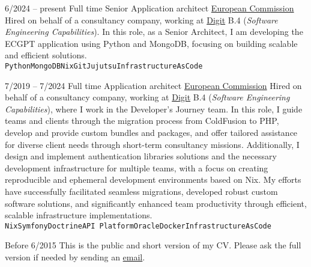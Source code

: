 \begin{entrylist}
	\entry
		{6/2024 -- present}
        {Full time}
		{Senior Application architect}
        {\href{https://ec.europa.eu/}{European Commission}}
        {
            Hired on behalf of a consultancy company, working at
            \href{https://ec.europa.eu/info/departments/informatics_en}{Digit} B.4 (\textit{Software Engineering Capabilities}).
			In this role, as a Senior Architect, I am developing the ECGPT application using Python and MongoDB,
			focusing on building scalable and efficient solutions.
			\\ \texttt{Python}\slashsep\texttt{MongoDB}\slashsep\texttt{Nix}\slashsep\texttt{Git}\slashsep\texttt{Jujutsu}\slashsep\texttt{InfrastructureAsCode}
        }

	\entry
		{7/2019 -- 7/2024}
        {Full time}
		{Application architect}
        {\href{https://ec.europa.eu/}{European Commission}}
        {
            Hired on behalf of a consultancy company, working at
            \href{https://ec.europa.eu/info/departments/informatics_en}{Digit} B.4 (\textit{Software Engineering Capabilities}),
            where I work in the Developer's Journey team. In this role, I guide teams and clients
            through the migration process from ColdFusion to PHP, develop and provide custom
            bundles and packages, and offer tailored assistance for diverse client needs through
            short-term consultancy missions. Additionally, I design and implement authentication libraries
            solutions and the necessary development infrastructure for multiple teams, with
            a focus on creating reproducible and ephemeral development environments based on Nix.
            My efforts have successfully facilitated seamless migrations, developed robust custom
            software solutions, and significantly enhanced team productivity through efficient,
            scalable infrastructure implementations.
			\\ \texttt{Nix}\slashsep\texttt{Symfony}\slashsep\texttt{Doctrine}\slashsep\texttt{API Platform}\slashsep\texttt{Oracle}\slashsep\texttt{Docker}\slashsep\texttt{InfrastructureAsCode}
        }

    \entry
        {\color{black!50}Before 6/2015}
        {}
        {}
        {}
        {\footnotesize{\color{black!50}This is the public and short version of my CV. Please ask the full version if needed by sending an \href{mailto:pol.dellaiera@protonmail.com}{email}.}}
\end{entrylist}

